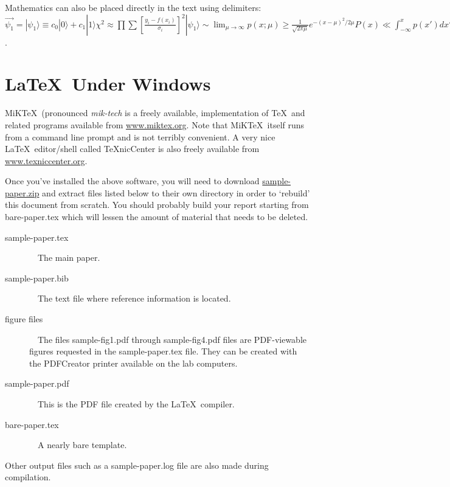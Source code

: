 Mathematics can also be placed directly in the text using
delimiters: $\vec{\psi_1} = |\psi_1\rangle \equiv c_0|0\rangle +
c_1|1\rangle \chi^2 \approx
\prod\sum\left[\frac{y_i-f(x_i)}{\sigma_i}\right]^2 |\psi_1\rangle
\sim \lim_{\mu \rightarrow \infty}p(x;\mu) \geq \frac{1}{\sqrt{2 \pi
\mu}} e^{-(x-\mu)^2 / 2\mu}P(x) \ll \int_{-\infty}^x p(x')dx'a
\times b \pm c \Rightarrow \nabla \hbar$.






\appendix
\section{\LaTeX\ Under Windows}
MiK\TeX\ (pronounced \emph{mik-tech} is a freely available, implementation of
\TeX\ and related programs available from \url{www.miktex.org}. Note
that MiK\TeX\ itself runs from a command line prompt and is not terribly
convenient.  A very nice \LaTeX\ editor/shell called \TeX nicCenter
is also freely available from
\url{www.texniccenter.org}. 

Once you've installed the above software, you will need to download
\href{uwf.edu/awade1/ModernLab/LabReport/sample-paper.zip}{sample-paper.zip}
and extract files listed below to their
own directory in order to `rebuild' this document from scratch.
You should probably build your report starting from
bare-paper.tex which will lessen the amount of material
that needs to be deleted.


\begin{description}
\item[sample-paper.tex]\ \ The main paper.
\item[sample-paper.bib]\ \ The text file where reference information is located.
\item[figure files]\ \ The files sample-fig1.pdf through sample-fig4.pdf files are PDF-viewable
figures requested in the sample-paper.tex file.  They can be created with the PDFCreator printer available on the lab computers.
\item[sample-paper.pdf]\ \ This is the PDF file created by the \LaTeX\ compiler.
\item[bare-paper.tex]\ \ A nearly bare template.
\end{description}
Other output files such as a sample-paper.log file are also made during compilation.

